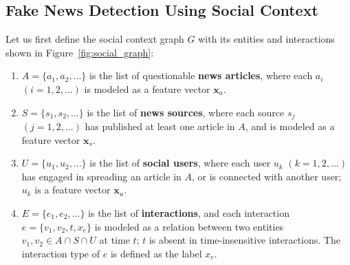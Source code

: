 \documentclass[sigconf]{acmart}
\theoremstyle{definition}
\theoremstyle{hypothesis}
\begin{document}
\subsection{Fake News Detection Using Social Context}
Let us first define the social context graph $G$ with 
its entities and interactions shown in Figure~\ref{fig:social_graph}:
\begin{enumerate}
    \item $A=\{a_1, a_2,...\}$ is the list of questionable \textbf{news articles}, 
    where each $a_{i}$ $(i=1,2,...)$ is modeled as a feature vector $\boldsymbol{x}_{a}$.
    \item $S=\{s_1, s_2,...\}$ is the list of \textbf{news sources}, where each source $s_j$ $(j=1,2,...)$ has published at least one article in $A$, %
    and is modeled as a feature vector $\boldsymbol{x}_{s}$.
    \item $U=\{u_1, u_2,...\}$ is the list of \textbf{social users}, where each user $u_{k}$ $(k=1,2,...)$ has engaged in spreading an article in $A$, or is connected with another user; $u_{k}$ is a feature vector $\boldsymbol{x}_{u}$.
    \item $E=\{e_1, e_2,...\}$ is the list of {\bf interactions}, and each interaction $e=\{v_1, v_2, t, x_e\}$ is modeled as a relation between two entities $v_1, v_2\in A\cap S\cap U$ at time $t$; %
    $t$ is absent in time-insensitive interactions. The interaction type of $e$ is defined as the label $x_{e}$.
\end{enumerate}
\end{document}
